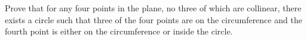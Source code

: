 Prove that for any four points in the plane, no three of which are collinear, there exists a circle such that three of the four points are on the circumference and the fourth point is either on the circumference or inside the circle.